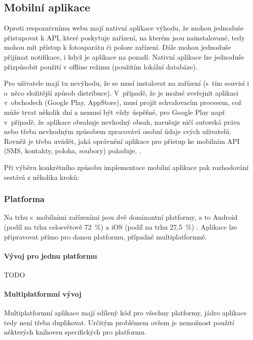\documentclass[twoside]{ctuthesis}
\begin{document}
\begin{enumerate}[label=\textbf{O\arabic*.}]
\subsection{Mobilní aplikace}

Oproti responzivnímu webu mají nativní aplikace výhodu, že mohou jednoduše přistupovat k API, které poskytuje zařízení, na kterém jsou nainstalované, tedy mohou mít přístup k fotoaparátu či poloze zařízení. Dále mohou jednoduše přijímat notifikace, i když je aplikace na pozadí. Nativní aplikace lze jednoduše přizpůsobit použití v offline režimu (použitím lokální databáze).

Pro uživatele mají tu nevýhodu, že se musí instalovat na zařízení (s~tím souvisí i o~něco složitější způsob distribuce). V~případě, že je možné zveřejnit aplikaci v~obchodech (Google Play, AppStore), musí projít schvalovacím procesem, což může trvat několik dní a nemusí být vždy úspěšné, pro Google Play např. v~případě, že aplikace obsahuje nevhodný obsah, narušuje ničí autorská práva nebo třeba nevhodným způsobem zpracovává osobní údaje svých uživatelů. Rovněž je třeba uvádět, jaká oprávnění aplikace pro přístup ke mobilním API (SMS, kontakty, poloha, soubory) požaduje. \cite{google2021policy}.

Při výběru konkrétního způsobu implementace mobilní aplikace pak rozhodování sestává z několika kroků:

\subsubsection{Platforma}
Na trhu s~mobilními zařízeními jsou dvě dominantní platformy, a to Android (podíl na trhu celosvětově 72~\%) a iOS (podíl na trhu 27,5~\%) \cite{statcounter2021mobile}. Aplikace lze připravovat přímo pro danou platformu, případně multiplatformně.

\paragraph{Vývoj pro jednu platformu}
TODO


\paragraph{Multiplatformní vývoj}
Multiplatformní aplikace mají sdílený kód pro všechny platformy, jádro aplikace tedy není třeba duplikovat. Určitým problémem ovšem je nemožnost použití některých knihoven specifických pro platformu.




\end{enumerate}
\end{document}
